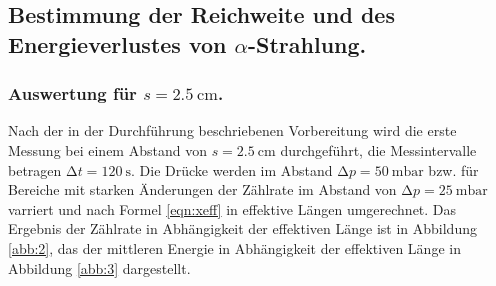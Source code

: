 
\subsection{\texorpdfstring{Bestimmung der Reichweite und des Energieverlustes von $\alpha$-Strahlung}{Bestimmung der Reichweite und des Energieverlustes von Alpha-Strahlung}.}

\subsubsection{\texorpdfstring{Auswertung für $s=\SI{2.5}{\centi\metre}$}{Auswertung für s = 2.5 cm}.}

Nach der in der Durchführung beschriebenen Vorbereitung wird die erste Messung bei einem Abstand von $s = \SI{2.5}{\centi\metre}$ durchgeführt, die Messintervalle betragen $\increment t = \SI{120}{\second}$.
Die Drücke werden im Abstand $\increment p = \SI{50}{\milli\bar}$ bzw. für Bereiche mit starken Änderungen der Zählrate im Abstand von $\increment p = \SI{25}{\milli\bar}$ varriert und nach Formel \eqref{eqn:xeff} in effektive Längen umgerechnet.
Das Ergebnis der Zählrate in Abhängigkeit der effektiven Länge ist in Abbildung \ref{abb:2}, das der mittleren Energie in Abhängigkeit der effektiven Länge in Abbildung \ref{abb:3} dargestellt.

